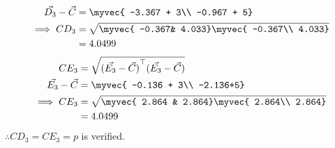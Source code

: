 \documentclass[journal,12pt,twocolumn]{IEEEtran}
\theoremstyle{remark}
\begin{document}
\begin{enumerate}
\begin{align}
	\vec{D_3}-\vec C&=\myvec{ -3.367 + 3\\
       -0.967 + 5}\\
\implies	{CD_3}&=\sqrt{\myvec{ -0.367&
       4.033}
       \myvec{ -0.367\\
       4.033}} \\
	&=4.0499 
\end{align}           
\begin{align}
	{CE_3}&=\sqrt{{(\vec{E_3}-\vec C)}^{\top}{(\vec{E_3}-\vec C)}}\\
	\vec{E_3}-\vec C&=\myvec{ -0.136 + 3\\ 
       -2.136+5}\\
\implies	{CE_3}&=\sqrt{\myvec{ 2.864 &
       2.864}
       \myvec{ 2.864\\ 
       2.864}}\\
	&= 4.0499            
\end{align}
$\therefore {CD_3}= {CE_3}=p$ is verified.
\end{enumerate}
\end{document}
